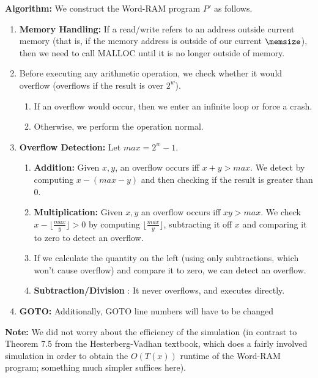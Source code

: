 \documentclass[11pt]{article}
\begin{document}
\begin{enumerate}
\begin{enumerate}
\textbf{Algorithm:}
We construct the Word-RAM program $P'$ as follows.

\begin{enumerate}
    \item \textbf{Memory Handling: } If a read/write refers to an address outside current memory (that is, if the memory address is outside of our current $\memsize$), then we need to call MALLOC until it is no longer outside of memory.
    \item Before executing any arithmetic operation, we check whether it would overflow (overflows if the result is over $2^w$).
        \begin{enumerate}
            \item If an overflow would occur, then we enter an infinite loop or force a crash.
            \item Otherwise, we perform the operation normal.
        \end{enumerate}
    \item \textbf{Overflow Detection: } Let $max=2^w-1$.
        \begin{enumerate}
            \item \textbf{Addition:} Given $x,y$, an overflow occurs iff $x+y > max.$ We detect by computing $x - (max -y)$ and then checking if the result is greater than 0.
            \item \textbf{Multiplication:} Given $x,y$ an overflow occurs iff $xy > max.$ We check $x - \lfloor \frac{max}{y} \rfloor > 0$ by computing $\lfloor \frac{max}{y} \rfloor$, subtracting it off $x$  and comparing it to zero to detect an overflow.
            \item If we calculate the quantity on the left (using only subtractions, which won't cause overflow) and compare it to zero, we can detect an overflow.
            \item \textbf{Subtraction/Division }: It never overflows, and executes directly.
        \end{enumerate}

    \item \textbf{GOTO: } Additionally, GOTO line numbers will have to be changed
\end{enumerate}

    \vspace{0.1in}
    \textbf{Note:} We did not worry about the efficiency of the simulation (in contrast to Theorem 7.5 from the Hesterberg-Vadhan textbook, which does a fairly involved simulation in order to obtain the $O(T(x))$ runtime  of the Word-RAM program; something much simpler suffices here).


\end{enumerate}
\end{enumerate}
\end{document}
